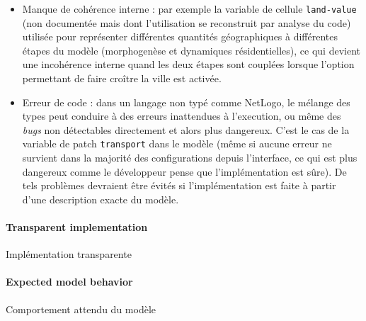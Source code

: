 {\begin{itemize}
\item Manque de cohérence interne : par exemple la variable de cellule \texttt{land-value} (non documentée mais dont l'utilisation se reconstruit par analyse du code) utilisée pour représenter différentes quantités géographiques à différentes étapes du modèle (morphogenèse et dynamiques résidentielles), ce qui devient une incohérence interne quand les deux étapes sont couplées lorsque l'option permettant de faire croître la ville est activée.
\item Erreur de code : dans un langage non typé comme NetLogo, le mélange des types peut conduire à des erreurs inattendues à l'execution, ou même des \emph{bugs} non détectables directement et alors plus dangereux. C'est le cas de la variable de patch \texttt{transport} dans le modèle (même si aucune erreur ne survient dans la majorité des configurations depuis l'interface, ce qui est plus dangereux comme le développeur pense que l'implémentation est sûre). De tels problèmes devraient être évités si l'implémentation est faite à partir d'une description exacte du modèle.
\end{itemize}
}



\paragraph{Transparent implementation}{Implémentation transparente}



\paragraph{Expected model behavior}{Comportement attendu du modèle}


